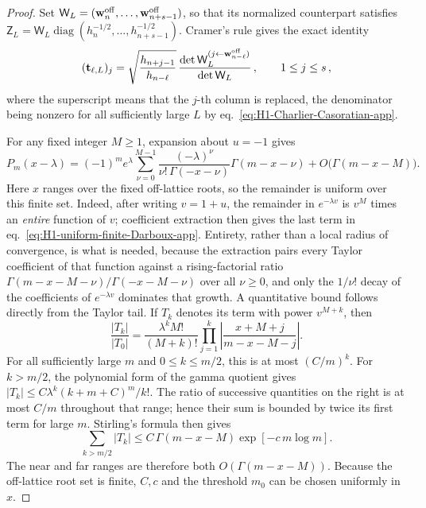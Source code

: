 \documentclass[a4paper,11pt]{article}
\def\ee{e}%
\theoremstyle{definition}
\theoremstyle{remark}
\newcommand{\ee}{\mathrm e}
\newcommand{\diag}{\operatorname{diag}}
\begin{document}
\begin{proof}
Set
\(\mathsf W_L=(\mathbf w_n^{\rm off},\ldots,
\mathbf w_{n+s-1}^{\rm off})\), so that its normalized counterpart satisfies
\(\mathsf Z_L=\mathsf W_L
\diag(h_n^{-1/2},\ldots,h_{n+s-1}^{-1/2})\).
Cramer's rule gives the exact identity
\begin{equation}
   (\mathbf t_{\ell,L})_j
   =\sqrt{\frac{h_{n+j-1}}{h_{n-\ell}}}\,
   \frac{
      \det\mathsf W_L^{(j\leftarrow\mathbf w_{n-\ell}^{\rm off})}
   }{\det\mathsf W_L}\,,
   \qquad 1\le j\le s\,,
   \label{eq:H1-packed-column-Cramer-app}
\end{equation}
where the superscript means that the \(j\)-th column is replaced, the denominator being
nonzero for all sufficiently large \(L\) by
eq.~\eqref{eq:H1-Charlier-Casoratian-app}.%

For any fixed integer \(M\ge1\), expansion about
\(u=-1\) gives
\begin{equation}
   P_m(x-\lambda)
   =(-1)^m\ee^\lambda
   \sum_{\nu=0}^{M-1}
   \frac{(-\lambda)^\nu}{\nu!\,\Gamma(-x-\nu)}
   \Gamma(m-x-\nu)
   +O\bigl(\Gamma(m-x-M)\bigr).
   \label{eq:H1-uniform-finite-Darboux-app}
\end{equation}
Here \(x\) ranges over the fixed off-lattice roots, so the remainder is
uniform over this finite set. Indeed, after writing \(v=1+u\), the
remainder in \(\ee^{-\lambda v}\) is \(v^M\) times an \emph{entire} function of $v$; coefficient extraction then gives the last term in
eq.~\eqref{eq:H1-uniform-finite-Darboux-app}. Entirety, rather than a local radius of
convergence, is what is needed, because the extraction pairs every Taylor coefficient of that function
against a rising-factorial ratio $\Gamma(m-x-M-\nu)/\Gamma(-x-M-\nu)$ over all $\nu\ge0$, and only
the $1/\nu!$ decay of the coefficients of $\ee^{-\lambda v}$ dominates that growth. 
A quantitative bound follows directly from the Taylor tail. If $T_k$ denotes its term with power $v^{M+k}$, then
\begin{equation}
   \frac{|T_k|}{|T_0|}
   =\frac{\lambda^kM!}{(M+k)!}
     \prod_{j=1}^{k}
     \left|\frac{x+M+j}{m-x-M-j}\right|.
\end{equation}
For all sufficiently large $m$ and $0\le k\le m/2$, this is at most $(C/m)^k$. For $k>m/2$, the polynomial form of the gamma quotient gives
$|T_k|\le C\lambda^k(k+m+C)^m/k!$. The ratio of successive quantities on the right is at most $C/m$ throughout that range; hence their sum is bounded by twice its first term for large $m$. Stirling's formula then gives
\begin{equation}
   \sum_{k>m/2}|T_k|
   \le C\,\Gamma(m-x-M)\exp[-c\,m\log m].
\end{equation}
The near and far ranges are therefore both $O(\Gamma(m-x-M))$. Because the off-lattice root set is finite, $C,c$ and the threshold $m_0$ can be chosen uniformly in $x$.%


\end{proof}
\end{document}
